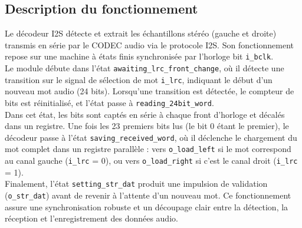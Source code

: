 


\subsection{Description du fonctionnement}

Le décodeur I2S détecte et extrait les échantillons stéréo (gauche et droite)
transmis en série par le CODEC audio via le protocole I2S. Son
fonctionnement repose sur une machine à états finis synchronisée par
l'horloge bit \verb|i_bclk|.\\

Le module débute dans l'état \verb|awaiting_lrc_front_change|, où il détecte
une transition sur le signal de sélection de mot \verb|i_lrc|, indiquant le
début d'un nouveau mot audio (24 bits). Lorsqu'une transition est détectée,
le compteur de bits est réinitialisé, et l'état passe à
\verb|reading_24bit_word|.\\

Dans cet état, les bits sont captés en série à chaque front d'horloge et
décalés dans un registre. Une fois les 23 premiers bits lus (le bit 0 étant
le premier), le décodeur passe à l'état \verb|saving_received_word|, où il
déclenche le chargement du mot complet dans un registre parallèle : vers
\verb|o_load_left| si le mot correspond au canal gauche (\verb|i_lrc| = 0),
ou vers \verb|o_load_right| si c'est le canal droit (\verb|i_lrc| = 1). \\

Finalement, l'état \verb|setting_str_dat| produit une impulsion de validation
(\verb|o_str_dat|) avant de revenir à l'attente d'un nouveau mot. Ce fonctionnement
assure une synchronisation robuste et un découpage clair entre la détection,
la réception et l'enregistrement des données audio. \\


